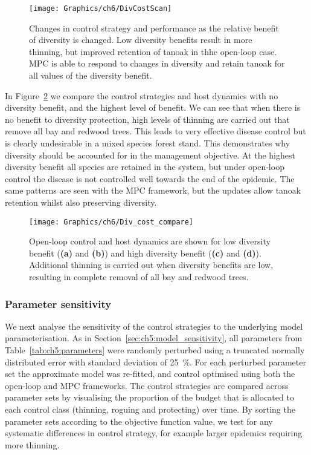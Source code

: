 \begin{figure}[h]
    \begin{center}
        \texttt{[image: Graphics/ch6/DivCostScan]}
        \caption[Varying the diversity benefits]{Changes in control strategy and performance as the relative benefit of diversity is changed. Low diversity benefits result in more thinning, but improved retention of tanoak in thhe open-loop case. MPC is able to respond to changes in diversity and retain tanoak for all values of the diversity benefit.\label{fig:ch6:div_scan}}
    \end{center}
\end{figure}

In Figure~\ref{fig:ch6:div_compare} we compare the control strategies and host dynamics with no diversity benefit, and the highest level of benefit. We can see that when there is no benefit to diversity protection, high levels of thinning are carried out that remove all bay and redwood trees. This leads to very effective disease control but is clearly undesirable in a mixed species forest stand. This demonstrates why diversity should be accounted for in the management objective. At the highest diversity benefit all species are retained in the system, but under open-loop control the disease is not controlled well towards the end of the epidemic. The same patterns are seen with the MPC framework, but the updates allow tanoak retention whilst also preserving diversity.

\begin{figure}[t]
    \begin{center}
        \texttt{[image: Graphics/ch6/Div\_cost\_compare]}
        \caption[Host dynamics when varying the diversity benefits]{Open-loop control and host dynamics are shown for low diversity benefit (\textbf{(a)} and \textbf{(b)}) and high diversity benefit (\textbf{(c)} and \textbf{(d)}). Additional thinning is carried out when diversity benefits are low, resulting in complete removal of all bay and redwood trees.\label{fig:ch6:div_compare}}
    \end{center}
\end{figure}

\subsubsection{Parameter sensitivity}

We next analyse the sensitivity of the control strategies to the underlying model parameterisation. As in Section~\ref{sec:ch5:model_sensitivity}, all parameters from Table~\ref{tab:ch5:parameters} were randomly perturbed using a truncated normally distributed error with standard deviation of \SI{25}{\percent}. For each perturbed parameter set the approximate model was re-fitted, and control optimised using both the open-loop and MPC frameworks. The control strategies are compared across parameter sets by visualising the proportion of the budget that is allocated to each control class (thinning, roguing and protecting) over time. By sorting the parameter sets according to the objective function value, we test for any systematic differences in control strategy, for example larger epidemics requiring more thinning.

